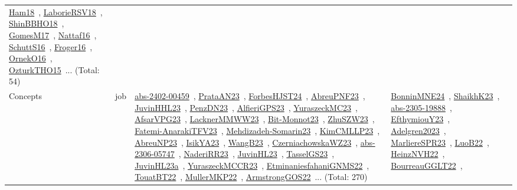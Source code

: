 {\begin{longtable}{lp{3cm}>{\raggedright\arraybackslash}p{6cm}>{\raggedright\arraybackslash}p{6cm}>{\raggedright\arraybackslash}p{8cm}}
\href{../works/Ham18.pdf}{Ham18}~\cite{Ham18}, \href{../works/LaborieRSV18.pdf}{LaborieRSV18}~\cite{LaborieRSV18}, \href{../works/ShinBBHO18.pdf}{ShinBBHO18}~\cite{ShinBBHO18}, \href{../works/GomesM17.pdf}{GomesM17}~\cite{GomesM17}, \href{../works/Nattaf16.pdf}{Nattaf16}~\cite{Nattaf16}, \href{../works/SchuttS16.pdf}{SchuttS16}~\cite{SchuttS16}, \href{../works/Froger16.pdf}{Froger16}~\cite{Froger16}, \href{../works/OrnekO16.pdf}{OrnekO16}~\cite{OrnekO16}, \href{../works/OzturkTHO15.pdf}{OzturkTHO15}~\cite{OzturkTHO15}... (Total: 54)\\
Concepts & job & \href{../works/abs-2402-00459.pdf}{abs-2402-00459}~\cite{abs-2402-00459}, \href{../works/PrataAN23.pdf}{PrataAN23}~\cite{PrataAN23}, \href{../works/ForbesHJST24.pdf}{ForbesHJST24}~\cite{ForbesHJST24}, \href{../works/AbreuPNF23.pdf}{AbreuPNF23}~\cite{AbreuPNF23}, \href{../works/JuvinHHL23.pdf}{JuvinHHL23}~\cite{JuvinHHL23}, \href{../works/PenzDN23.pdf}{PenzDN23}~\cite{PenzDN23}, \href{../works/AlfieriGPS23.pdf}{AlfieriGPS23}~\cite{AlfieriGPS23}, \href{../works/YuraszeckMC23.pdf}{YuraszeckMC23}~\cite{YuraszeckMC23}, \href{../works/AfsarVPG23.pdf}{AfsarVPG23}~\cite{AfsarVPG23}, \href{../works/LacknerMMWW23.pdf}{LacknerMMWW23}~\cite{LacknerMMWW23}, \href{../works/Bit-Monnot23.pdf}{Bit-Monnot23}~\cite{Bit-Monnot23}, \href{../works/ZhuSZW23.pdf}{ZhuSZW23}~\cite{ZhuSZW23}, \href{../works/Fatemi-AnarakiTFV23.pdf}{Fatemi-AnarakiTFV23}~\cite{Fatemi-AnarakiTFV23}, \href{../works/Mehdizadeh-Somarin23.pdf}{Mehdizadeh-Somarin23}~\cite{Mehdizadeh-Somarin23}, \href{../works/KimCMLLP23.pdf}{KimCMLLP23}~\cite{KimCMLLP23}, \href{../works/AbreuNP23.pdf}{AbreuNP23}~\cite{AbreuNP23}, \href{../works/IsikYA23.pdf}{IsikYA23}~\cite{IsikYA23}, \href{../works/WangB23.pdf}{WangB23}~\cite{WangB23}, \href{../works/CzerniachowskaWZ23.pdf}{CzerniachowskaWZ23}~\cite{CzerniachowskaWZ23}, \href{../works/abs-2306-05747.pdf}{abs-2306-05747}~\cite{abs-2306-05747}, \href{../works/NaderiRR23.pdf}{NaderiRR23}~\cite{NaderiRR23}, \href{../works/JuvinHL23.pdf}{JuvinHL23}~\cite{JuvinHL23}, \href{../works/TasselGS23.pdf}{TasselGS23}~\cite{TasselGS23}, \href{../works/JuvinHL23a.pdf}{JuvinHL23a}~\cite{JuvinHL23a}, \href{../works/YuraszeckMCCR23.pdf}{YuraszeckMCCR23}~\cite{YuraszeckMCCR23}, \href{../works/EtminaniesfahaniGNMS22.pdf}{EtminaniesfahaniGNMS22}~\cite{EtminaniesfahaniGNMS22}, \href{../works/TouatBT22.pdf}{TouatBT22}~\cite{TouatBT22}, \href{../works/MullerMKP22.pdf}{MullerMKP22}~\cite{MullerMKP22}, \href{../works/ArmstrongGOS22.pdf}{ArmstrongGOS22}~\cite{ArmstrongGOS22}... (Total: 270) & \href{../works/BonninMNE24.pdf}{BonninMNE24}~\cite{BonninMNE24}, \href{../works/ShaikhK23.pdf}{ShaikhK23}~\cite{ShaikhK23}, \href{../works/abs-2305-19888.pdf}{abs-2305-19888}~\cite{abs-2305-19888}, \href{../works/EfthymiouY23.pdf}{EfthymiouY23}~\cite{EfthymiouY23}, \href{../works/Adelgren2023.pdf}{Adelgren2023}~\cite{Adelgren2023}, \href{../works/MarliereSPR23.pdf}{MarliereSPR23}~\cite{MarliereSPR23}, \href{../works/LuoB22.pdf}{LuoB22}~\cite{LuoB22}, \href{../works/HeinzNVH22.pdf}{HeinzNVH22}~\cite{HeinzNVH22}, \href{../works/BourreauGGLT22.pdf}{BourreauGGLT22}~\cite{BourreauGGLT22}, 
\end{longtable}}
